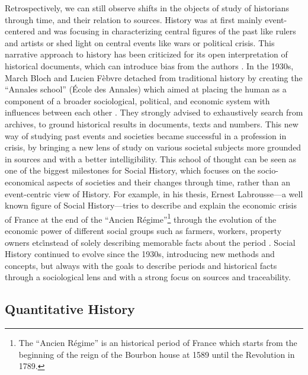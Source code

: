 Retrospectively, we can still observe shifts in the objects of study of historians through time, and their relation to sources.
History was at first mainly event-centered and was focusing in characterizing central figures of the past like rulers and artists or shed light on central events like wars or political crisis.
This narrative approach to history has been criticized for its open interpretation of historical documents, which can introduce bias from the authors \cite{bourdieuRapportsEntreSociologie1995}.
In the 1930s, March Bloch and Lucien Fèbvre detached from traditional history by creating the ``Annales school'' (\'Ecole des Annales) which aimed at placing the human as a component of a broader sociological, political, and economic system with influences between each other \cite{burkeHistorySocialTheory2005}.
They strongly advised to exhaustively search from archives, to ground historical results in documents, texts and numbers.
This new way of studying past events and societies became successful in a profession in crisis, by bringing a new lens of study on various societal subjects more grounded in sources and with a better intelligibility.
This school of thought can be seen as one of the biggest milestones for Social History, which focuses on the socio-economical aspects of societies and their changes through time, rather than an event-centric view of History.
For example, in his thesis, Ernest Labrousse---a well known figure of Social History---tries to describe and explain the economic crisis of France at the end of the ``Ancien Régime''\footnote{The ``Ancien Régime'' is an historical period of France which starts from the beginning of the reign of the Bourbon house at 1589 until the Revolution in 1789.} through the evolution of the economic power of different social groups such as farmers, workers, property owners etc\. instead of solely describing memorable facts about the period \cite{labrousse1990crise}.
Social History continued to evolve since the 1930s, introducing new methods and concepts, but always with the goals to describe periods and historical facts through a sociological lens and with a strong focus on sources and traceability.


\subsection{Quantitative History}\label{subsec:quantitative-history}

